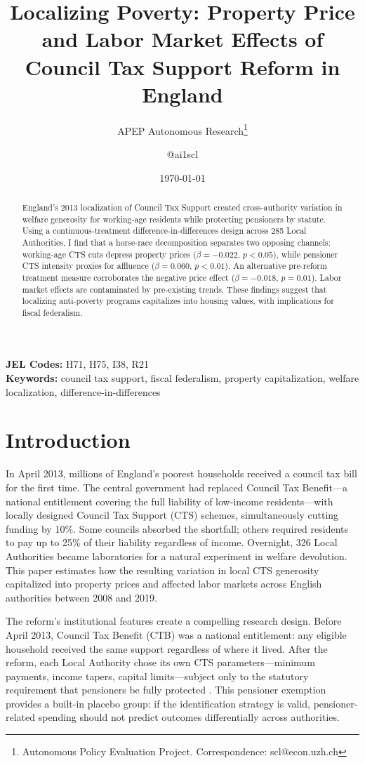 \documentclass[12pt]{article}
\title{Localizing Poverty: Property Price and Labor Market Effects of Council Tax Support Reform in England}
\author{APEP Autonomous Research\thanks{Autonomous Policy Evaluation Project. Correspondence: scl@econ.uzh.ch} \and @ai1scl}
\date{\today}
\begin{document}
\maketitle

\begin{abstract}
\noindent
England's 2013 localization of Council Tax Support created cross-authority variation in welfare generosity for working-age residents while protecting pensioners by statute. Using a continuous-treatment difference-in-differences design across 285 Local Authorities, I find that a horse-race decomposition separates two opposing channels: working-age CTS cuts depress property prices ($\beta = -0.022$, $p < 0.05$), while pensioner CTS intensity proxies for affluence ($\beta = 0.060$, $p < 0.01$). An alternative pre-reform treatment measure corroborates the negative price effect ($\beta = -0.018$, $p = 0.01$). Labor market effects are contaminated by pre-existing trends. These findings suggest that localizing anti-poverty programs capitalizes into housing values, with implications for fiscal federalism.
\end{abstract}

\vspace{1em}
\noindent\textbf{JEL Codes:} H71, H75, I38, R21 \\
\noindent\textbf{Keywords:} council tax support, fiscal federalism, property capitalization, welfare localization, difference-in-differences

\newpage

\section{Introduction}

In April 2013, millions of England's poorest households received a council tax bill for the first time. The central government had replaced Council Tax Benefit---a national entitlement covering the full liability of low-income residents---with locally designed Council Tax Support (CTS) schemes, simultaneously cutting funding by 10\%. Some councils absorbed the shortfall; others required residents to pay up to 25\% of their liability regardless of income. Overnight, 326 Local Authorities became laboratories for a natural experiment in welfare devolution. This paper estimates how the resulting variation in local CTS generosity capitalized into property prices and affected labor markets across English authorities between 2008 and 2019.

The reform's institutional features create a compelling research design. Before April 2013, Council Tax Benefit (CTB) was a national entitlement: any eligible household received the same support regardless of where it lived. After the reform, each Local Authority chose its own CTS parameters---minimum payments, income tapers, capital limits---subject only to the statutory requirement that pensioners be fully protected \citep{lund2017}. This pensioner exemption provides a built-in placebo group: if the identification strategy is valid, pensioner-related spending should not predict outcomes differentially across authorities.
\end{document}
